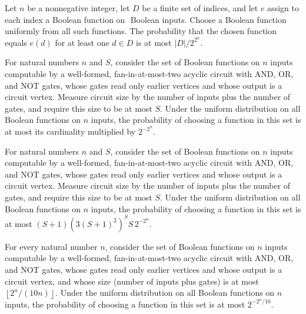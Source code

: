 \begin{theorem}
\label{BoolCircuit.prob_exists_eq_le}
\leanok
{}
Let $n$ be a nonnegative integer, let $D$ be a finite set of indices, and let $e$ assign
to each index a Boolean function on $
$ Boolean inputs. Choose a Boolean function uniformly from all such functions. The
probability that the chosen function equals $e(d)$ for at least one $d\in D$ is at most
$|D|/2^{2^n}$.
\end{theorem}

\begin{theorem}
\label{BoolCircuit.prob_computableDAG_le}
\leanok
{}
For natural numbers $n$ and $S$, consider the set of Boolean functions on $n$ inputs
computable by a well-formed, fan-in-at-most-two acyclic circuit with AND, OR, and NOT
gates, whose gates read only earlier vertices and whose output is a circuit vertex.
Measure circuit size by the number of inputs plus the number of gates, and require this
size to be at most $S$. Under the uniform distribution on all Boolean functions on $n$
inputs, the probability of choosing a function in this set is at most its cardinality
multiplied by $2^{-2^n}$.
\end{theorem}

\begin{theorem}
\label{BoolCircuit.prob_computableDAG_le_count}
\leanok
{}
For natural numbers $n$ and $S$, consider the set of Boolean functions on $n$ inputs
computable by a well-formed, fan-in-at-most-two acyclic circuit with AND, OR, and NOT
gates, whose gates read only earlier vertices and whose output is a circuit vertex.
Measure circuit size by the number of inputs plus the number of gates, and require this
size to be at most $S$. Under the uniform distribution on all Boolean functions on $n$
inputs, the probability of choosing a function in this set is at most $(S+1)(3(S+1)^2)^S
S\,2^{-2^n}$.
\end{theorem}

\begin{theorem}
\label{BoolCircuit.prob_computableDAG_shannon_le}
\leanok
{}
For every natural number $n$, consider the set of Boolean functions on $n$ inputs
computable by a well-formed, fan-in-at-most-two acyclic circuit with AND, OR, and NOT
gates, whose gates read only earlier vertices and whose output is a circuit vertex, and
whose size (number of inputs plus gates) is at most $\left\lfloor
2^n/(10n)\right\rfloor$. Under the uniform distribution on all Boolean functions on $n$
inputs, the probability of choosing a function in this set is at most $2^{-2^n/10}$.
\end{theorem}

